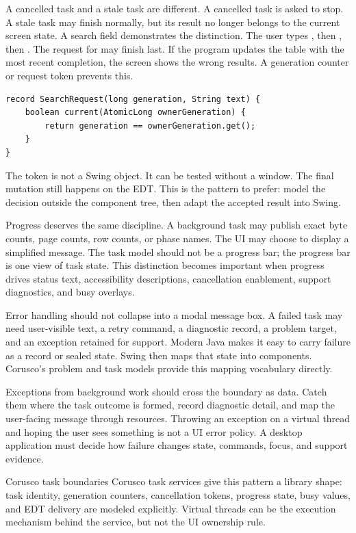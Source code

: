A cancelled task and a stale task are different. A cancelled task is asked to stop. A stale task may finish normally, but its result no longer belongs to the current screen state. A search field demonstrates the distinction. The user types , then , then . The request for  may finish last. If the program updates the table with the most recent completion, the screen shows the wrong results. A generation counter or request token prevents this.

\begin{lstlisting}[caption={A small request token for stale-result suppression.}]
record SearchRequest(long generation, String text) {
    boolean current(AtomicLong ownerGeneration) {
        return generation == ownerGeneration.get();
    }
}
\end{lstlisting}

The token is not a Swing object. It can be tested without a window. The final mutation still happens on the EDT. This is the pattern to prefer: model the decision outside the component tree, then adapt the accepted result into Swing.

Progress deserves the same discipline. A background task may publish exact byte counts, page counts, row counts, or phase names. The UI may choose to display a simplified message. The task model should not be a progress bar; the progress bar is one view of task state. This distinction becomes important when progress drives status text, accessibility descriptions, cancellation enablement, support diagnostics, and busy overlays.

Error handling should not collapse into a modal message box. A failed task may need user-visible text, a retry command, a diagnostic record, a problem target, and an exception retained for support. Modern Java makes it easy to carry failure as a record or sealed state. Swing then maps that state into components. Corusco's problem and task models provide this mapping vocabulary directly.

Exceptions from background work should cross the boundary as data. Catch them where the task outcome is formed, record diagnostic detail, and map the user-facing message through resources. Throwing an exception on a virtual thread and hoping the user sees something is not a UI error policy. A desktop application must decide how failure changes state, commands, focus, and support evidence.

\begin{coruscobox}{Corusco task boundaries}
Corusco task services give this pattern a library shape: task identity, generation counters, cancellation tokens, progress state, busy values, and EDT delivery are modeled explicitly. Virtual threads can be the execution mechanism behind the service, but not the UI ownership rule.
\end{coruscobox}

